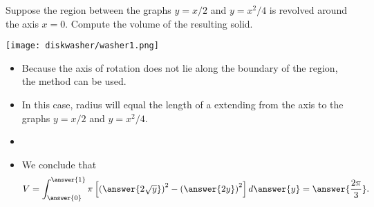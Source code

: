 \documentclass{ximera}
\begin{document}
\begin{example}
Suppose the region between the graphs $y = x/2$ and $y=x^2/4$ is revolved around the axis $x=0$. Compute the volume of the resulting solid.
\begin{center}
\begin{image}
\texttt{[image: diskwasher/washer1.png]}
\end{image}
\end{center}
\begin{itemize}
\item Because the axis of rotation does not lie along the boundary of the region, the  method can be used.
\item In this case, radius will equal the length of a  extending from the axis to the graphs $y = x/2$ and $y = x^2/4$.
\item 
\begin{multipleChoice}
\end{multipleChoice}
\item We conclude that
\[ V = \int_{\answer{0}}^{\answer{1}} \pi \left[  \left( \answer{2 \sqrt{y}} \right)^2 - \left( \answer{2 y} \right)^2  \right] d\answer{y} = \answer{\frac{2 \pi}{3}}. \]
\end{itemize}
\end{example}
\end{document}
